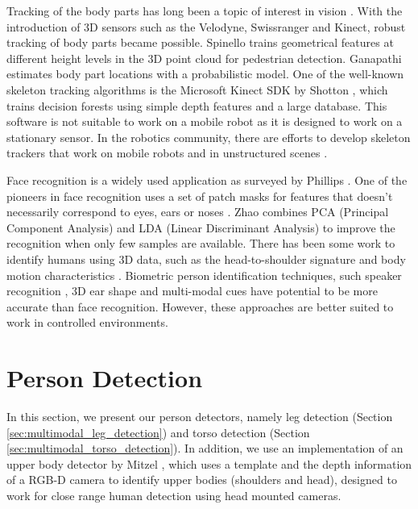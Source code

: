 Tracking of the body parts has long been a topic of interest in vision \cite{baumberg1997learning,sidenbladh2000stochastic}. With the introduction of 3D sensors such as the Velodyne, Swissranger and Kinect, robust tracking of body parts became possible. Spinello \cite{spinello2010layered} trains geometrical features at different height levels in the 3D point cloud for pedestrian detection. Ganapathi \cite{ganapathi2010real} estimates body part locations with a probabilistic model. One of the well-known skeleton tracking algorithms is the Microsoft Kinect SDK by Shotton \cite{shotton2013real}, which trains decision forests using simple depth features and a large database. This software is not suitable to work on a mobile robot as it is designed to work on a stationary sensor. In the robotics community, there are efforts to develop skeleton trackers that work on mobile robots and in unstructured scenes \cite{buys2013adaptable}.

Face recognition is a widely used application as surveyed by Phillips \cite{phillips2005overview}. One of the pioneers in face recognition uses a set of patch masks for features that doesn't necessarily correspond to eyes, ears or noses \cite{turk1991face}. Zhao \cite{zhao1998discriminant} combines PCA (Principal Component Analysis) and LDA (Linear Discriminant Analysis) to improve the recognition when only few samples are available. There has been some work to identify humans using 3D data, such as the head-to-shoulder signature \cite{kirchner2012head} and body motion characteristics \cite{munsell2012person}. Biometric person identification techniques, such speaker recognition \cite{kinnunen2010overview}, 3D ear shape \cite{yan2007biometric} and multi-modal cues \cite{garcia2003biomet} have potential to be more accurate than face recognition. However, these approaches are better suited to work in controlled environments.

\section{Person Detection}
\label{sec:multimodal_person_detection}

In this section, we present our person detectors, namely leg detection (Section \ref{sec:multimodal_leg_detection}) and torso detection (Section \ref{sec:multimodal_torso_detection}). In addition, we use an implementation of an upper body detector by Mitzel \cite{mitzel2012close}, which uses a template and the depth information of a RGB-D camera to identify upper bodies (shoulders and head), designed to work for close range human detection using head mounted cameras.

